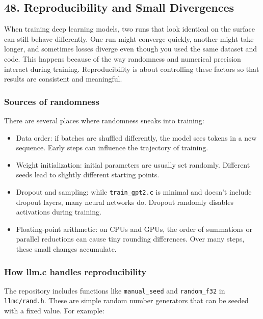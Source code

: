 \documentclass[
  letterpaper,
  DIV=11,
  numbers=noendperiod]{scrreprt}
\providecommand{\tightlist}{%
  \setlength{\itemsep}{0pt}\setlength{\parskip}{0pt}}
\begin{document}
\subsection{48. Reproducibility and Small
Divergences}\label{reproducibility-and-small-divergences}

When training deep learning models, two runs that look identical on the
surface can still behave differently. One run might converge quickly,
another might take longer, and sometimes losses diverge even though you
used the same dataset and code. This happens because of the way
randomness and numerical precision interact during training.
Reproducibility is about controlling these factors so that results are
consistent and meaningful.

\subsubsection{Sources of randomness}\label{sources-of-randomness}

There are several places where randomness sneaks into training:

\begin{itemize}
\tightlist
\item
  Data order: if batches are shuffled differently, the model sees tokens
  in a new sequence. Early steps can influence the trajectory of
  training.
\item
  Weight initialization: initial parameters are usually set randomly.
  Different seeds lead to slightly different starting points.
\item
  Dropout and sampling: while \texttt{train\_gpt2.c} is minimal and
  doesn't include dropout layers, many neural networks do. Dropout
  randomly disables activations during training.
\item
  Floating-point arithmetic: on CPUs and GPUs, the order of summations
  or parallel reductions can cause tiny rounding differences. Over many
  steps, these small changes accumulate.
\end{itemize}

\subsubsection{How llm.c handles
reproducibility}\label{how-llm.c-handles-reproducibility}

The repository includes functions like \texttt{manual\_seed} and
\texttt{random\_f32} in \texttt{llmc/rand.h}. These are simple random
number generators that can be seeded with a fixed value. For example:
\end{document}
